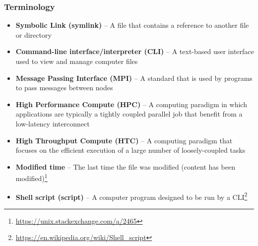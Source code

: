 \begin{frame}
	\frametitle{Terminology}
	\begin{itemize}
	\item \textbf{Symbolic Link (symlink)} -- A file that contains a reference to another file or directory
	\item \textbf{Command-line interface/interpreter (CLI)} -- A text-based user interface used to view and manage computer files 
	\item \textbf{Message Passing Interface (MPI)} -- A standard that is used by programs to pass messages between nodes
	\item \textbf{High Performance Compute (HPC)} -- A computing paradigm in which applications are typically a tightly coupled parallel job that benefit from a low-latency interconnect
	\item \textbf{High Throughput Compute (HTC)} -- A computing paradigm that focuses on the efficient execution of a large number of loosely-coupled tasks
        \item \textbf{Modified time} -- The last time the file was modified (content has been modified)\footnote{\label{Types of timestamps}\tiny\url{https://unix.stackexchange.com/a/2465}}
        \item \textbf{Shell script (script)} -- A computer program designed to be run by a CLI\footnote{\label{Shell script}\tiny\url{https://en.wikipedia.org/wiki/Shell_script}}
	\end{itemize}


\end{frame}


